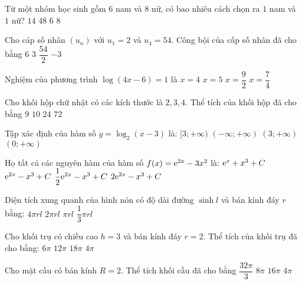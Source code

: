 \begin{ex}%
Từ một nhóm học sinh gồm $6$ nam và $8$ nữ, có bao nhiêu cách chọn ra $1$ nam và $1$ nữ?
\choice
{$14$}
{\True $48$}
{$6$}
{$8$}

\end{ex}
\begin{ex}%
Cho cáp số nhân $\left(u_n\right)$ với $u_1=2$ và $u_4=54$. Công bội của cấp số nhân đã cho bằng
\choice
{$6$}
{\True $3$}
{$\dfrac{54}{2}$}
{$-3$}

\end{ex}
\begin{ex}%
Nghiệm của phương trình $\log (4 x-6)=1$ là
\choice
{\True $x=4$}
{$x=5$}
{$x=\dfrac{9}{2}$}
{$x=\dfrac{7}{4}$}

\end{ex}
\begin{ex}%
Cho khối hộp chữ nhật có các kích thước là $2,3,4$. Thể tích của khối hộp đã cho bằng
\choice
{$9$}
{$10$}
{\True $24$}
{$72$}

\end{ex}
\begin{ex}%
Tập xác định của hàm số $y=\log_2(x-3)$ là:
\choice
{$[3;+\infty)$}
{$(-\infty;+\infty)$}
{\True $(3;+\infty)$}
{$(0;+\infty)$}

\end{ex}
\begin{ex}%
Họ tất cả các nguyên hàm của hàm số $f(x)={\rm e}^{2 x}-3 x^2$ là:
\choice
{${\rm e}^{x}+x^3+C$}
{${\rm e}^{2 x}-x^3+C$}
{\True $\dfrac{1}{2} {\rm e}^{2 x}-x^3+C$}
{$2 {\rm e}^{2 x}-x^3+C$}

\end{ex}
\begin{ex}%
Diện tích xung quanh của hình nón có độ dài đường $\sinh l$ và bán kính đáy $r$ bằng:
\choice
{$4\pi r l$}
{$2\pi r l$}
{\True $\pi r l$}
{$\dfrac{1}{3} \pi r l$}

\end{ex}
\begin{ex}%
Cho khối trụ có chiều cao $h=3$ và bán kính đáy $r=2$. Thể tích của khối trụ đã cho bằng:
\choice
{$6\pi$}
{\True $12\pi$}
{$18\pi$}
{$4\pi$}

\end{ex}
\begin{ex}%
Cho mặt cầu có bán kính $R=2$. Thể tích khối cầu đã cho bằng
\choice
{\True $\dfrac{32\pi}{3}$}
{$8\pi$}
{$16\pi$}
{$4\pi$}

\end{ex}
